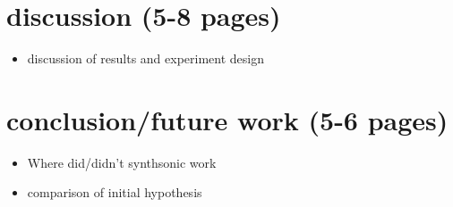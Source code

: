 \documentclass{article}
\begin{document}
    
\section{discussion (5-8 pages)}
    \begin{itemize}
        \item discussion of results and experiment design
    \end{itemize}

\section{conclusion/future work (5-6 pages)}
    \begin{itemize}
        \item Where did/didn't synthsonic work
        \item comparison of initial hypothesis
    \end{itemize}
\end{document}
